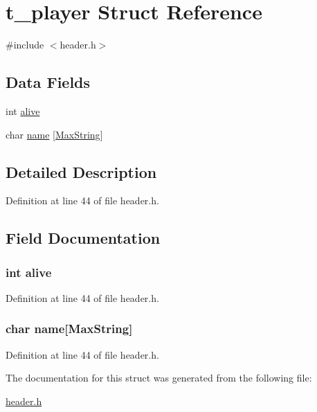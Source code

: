 \hypertarget{structt__player}{\section{t\-\_\-player Struct Reference}
\label{structt__player}
}


{\ttfamily \#include $<$header.\-h$>$}

\subsection*{Data Fields}
\begin{DoxyCompactItemize}
\item 
int \hyperlink{structt__player_afaea7716a081e71f804e80c2d5a92390}{alive}
\item 
char \hyperlink{structt__player_ab27f28c5ead39031421706ddbbd1edea}{name} \mbox{[}\hyperlink{header_8h_ab154998a3a376095f3601bc35c5cf523}{Max\-String}\mbox{]}
\end{DoxyCompactItemize}


\subsection{Detailed Description}


Definition at line 44 of file header.\-h.



\subsection{Field Documentation}
\hypertarget{structt__player_afaea7716a081e71f804e80c2d5a92390}{
\subsubsection[{alive}]{\setlength{\rightskip}{0pt plus 5cm}int alive}}\label{structt__player_afaea7716a081e71f804e80c2d5a92390}


Definition at line 44 of file header.\-h.

\hypertarget{structt__player_ab27f28c5ead39031421706ddbbd1edea}{
\subsubsection[{name}]{\setlength{\rightskip}{0pt plus 5cm}char name\mbox{[}{\bf Max\-String}\mbox{]}}}\label{structt__player_ab27f28c5ead39031421706ddbbd1edea}


Definition at line 44 of file header.\-h.



The documentation for this struct was generated from the following file\-:\begin{DoxyCompactItemize}
\item 
\hyperlink{header_8h}{header.\-h}\end{DoxyCompactItemize}
